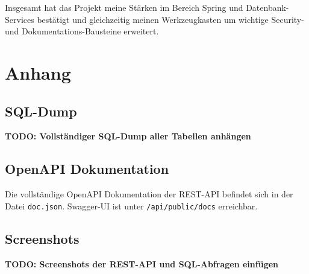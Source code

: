 \documentclass[12pt,a4paper]{article}
\begin{document}
    Insgesamt hat das Projekt meine Stärken im Bereich Spring und Datenbank-Services bestätigt und
    gleichzeitig meinen Werkzeugkasten um wichtige Security- und Dokumentations-Bausteine erweitert.

    \section{Anhang}

    \subsection{SQL-Dump}
    \textbf{TODO: Vollständiger SQL-Dump aller Tabellen anhängen}

    \subsection{OpenAPI Dokumentation}
    Die vollständige OpenAPI Dokumentation der REST-API befindet sich in der Datei \texttt{doc.json}.
    Swagger-UI ist unter \texttt{/api/public/docs} erreichbar.

    \subsection{Screenshots}
    \textbf{TODO: Screenshots der REST-API und SQL-Abfragen einfügen}
\end{document}
